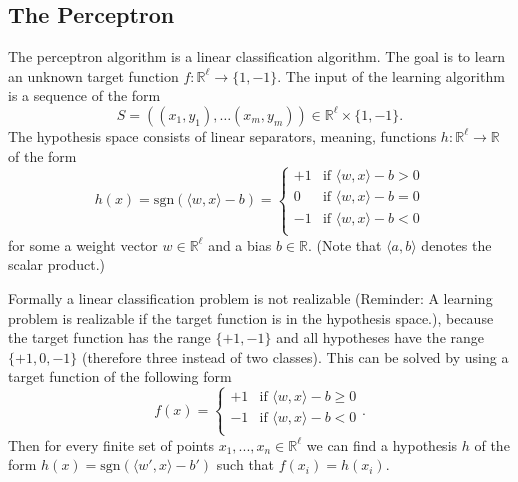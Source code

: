\documentclass[english]{panikzettel}
\begin{document}



\subsection{The Perceptron}
The perceptron algorithm is a linear classification algorithm. The goal is to learn an unknown target function \mbox{$f:\mathbb{R}^\ell \rightarrow \{1,-1\}$.} The input of the learning algorithm is a sequence of the form
\[
S=((x_1,y_1),\ldots (x_m,y_m))\in\mathbb{R}^\ell\times\{1,-1\}.
\]
The hypothesis space consists of linear separators, meaning, functions $h:\mathbb{R}^\ell \rightarrow \mathbb{R}$ of the form
\[
h(x)=\text{sgn}(\langle w,x\rangle -b)=
\begin{cases}
+1 & \text{if } \langle w,x\rangle-b > 0  \\
0 & \text{if } \langle w,x\rangle-b = 0  \\
-1 & \text{if } \langle w,x\rangle-b < 0  \\
\end{cases}
\]
for some a weight vector $w\in\mathbb{R}^\ell$ and a bias $b\in\mathbb{R}$. (Note that $\langle a,b\rangle$ denotes the scalar product.)

Formally a linear classification problem is not realizable (Reminder: A learning problem is realizable if the target function is in the hypothesis space.), because the target function has the range $\{+1, -1\}$ and all hypotheses have the range $\{+1, 0, -1\}$ (therefore three instead of two classes). This can be solved by using a target function of the following form
\[
f(x)=
\begin{cases}
+1 & \text{if } \langle w,x\rangle-b \geq 0\\
-1 & \text{if } \langle w,x\rangle-b < 0\\
\end{cases}.
\]
Then for every finite set of points $x_1,...,x_n\in\mathbb{R}^\ell$ we can find a hypothesis $h$ of the form $h(x)=\text{sgn}(\langle w',x\rangle-b')$ such that $f(x_i)=h(x_i)$.
\end{document}
